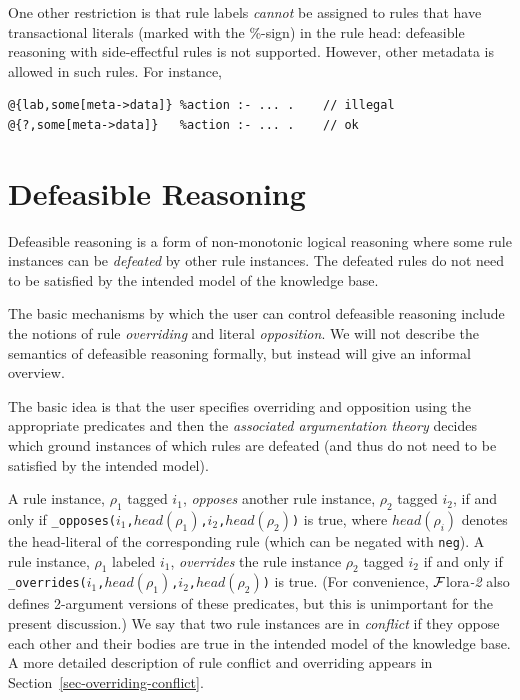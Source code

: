 \documentclass[11pt]{article}
\newcommand{\FLORA}{{\mbox{\sc ${\cal F}${lora}\rm\emph{-2}}}\xspace}
\begin{document}
One other restriction is that
rule labels \emph{cannot} be assigned to rules that have
transactional literals (marked with the \%-sign) in the rule head:
defeasible reasoning with side-effectful rules is not supported.
However, other metadata is allowed in such rules.
For instance,
\begin{verbatim}
@{lab,some[meta->data]} %action :- ... .    // illegal
@{?,some[meta->data]}   %action :- ... .    // ok
\end{verbatim}


\section{Defeasible Reasoning}
\label{sec-defeasible}

Defeasible reasoning is a form of non-monotonic logical reasoning where
some rule instances can be \emph{defeated}  by other rule instances. The
defeated rules do not need to be satisfied by the intended model of the
knowledge base.

The basic mechanisms by which the user can control defeasible
reasoning include the notions of rule \emph{overriding} and literal
\emph{opposition}.  We will not describe the semantics of defeasible
reasoning formally, but instead will give an informal overview.

The basic idea is that the user specifies overriding and
opposition using the appropriate predicates and then the \emph{associated
argumentation theory} decides which ground instances of which rules are
defeated (and thus do not need to be satisfied by the intended model).  

A rule instance, $\rho_1$ tagged $i_1$, \emph{opposes} another rule
instance, $\rho_2$ tagged $i_2$, if and only if
\texttt{\_opposes($i_1$,$head(\rho_1)$,$i_2$,$head(\rho_2)$)} is true,
where $head(\rho_i)$ denotes the head-literal of the corresponding rule
(which can be negated with {\tt neg}). A rule instance, $\rho_1$ labeled
$i_1$, \emph{overrides} the rule instance $\rho_2$ tagged $i_2$ if and
only if \texttt{\_overrides($i_1$,$head(\rho_1)$,$i_2$,$head(\rho_2)$)} is
true. (For convenience, \FLORA also defines 2-argument versions of these
predicates, but this is unimportant for the present discussion.)
We say that two rule instances are in \emph{conflict} if they oppose each other
and their bodies are true in the intended model of the knowledge base.
A more detailed description of rule conflict and overriding appears in
Section~\ref{sec-overriding-conflict}.
\end{document}
